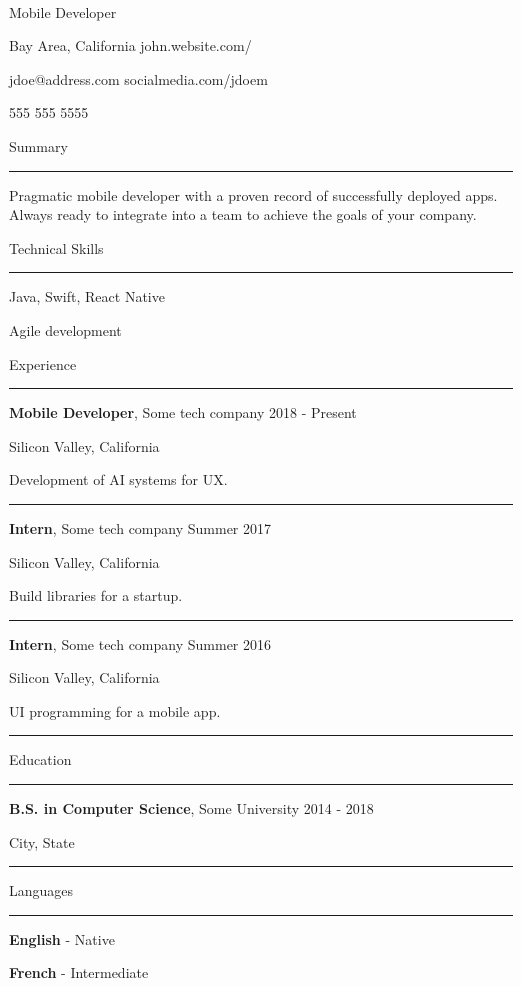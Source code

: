 \documentclass[12pt]{article}
\newcommand{\resumesection}[1]{
    {
        \color{accentcolor}
        \noindent
        \large{#1}
        \vspace{-8pt}

        \noindent
        \rule{\textwidth}{2pt}
    }
}
\newcommand{\info}[2]{
    {
        \color{secondarytext}
        \trivlist\nopagebreak
        \parindent0pt
        \item #1 \hspace{\fill} #2
        \item\relax\obeylines
    }
    \vspace{-5pt}
}
\newcommand{\job}[5]{
    \textbf{#2}, #3 \hspace{\fill} #1

    {\color{secondarytext}#4}

    #5

    \vspace{-5pt}
    {
        \color{secondaccentcolor}
        \rule{0.96\textwidth}{0.5pt}
    }

    \vspace{10pt}
}
\newcommand{\education}[4]{
    \textbf{#2}, #3 \hspace{\fill} #1

    {\color{secondarytext}#4}

    \vspace{-5pt}
    {
        \color{secondaccentcolor}
        \rule{0.96\textwidth}{0.5pt}
    }

    \vspace{10pt}
}
\newcommand{\languageprof}[2]{
    \raisebox{3pt}{$\centerdot$} \textbf{#1} - #2

    \vspace{5pt}
}
\newcommand{\closerlist}[1]{
    \raisebox{3pt}{$\centerdot$} #1

    \vspace{5pt}
}
\begin{document}
\begin{center}
     \\
    \vspace{0.25cm}
    \Large{Mobile Developer}
\end{center}

\info{Bay Area, California}{john.website.com/}
\info{jdoe@address.com}{socialmedia.com/jdoem}
\info{555 555 5555}{}

\vspace{15pt}
\resumesection{Summary}

\hangindent=15pt
Pragmatic mobile developer with a proven record of successfully deployed apps. Always ready to integrate into a team to achieve the goals of your company.

\vspace{15pt}
\resumesection{Technical Skills}

\closerlist{Java, Swift, React Native}
\closerlist{Agile development}

\vspace{10pt}
\resumesection{Experience}

\job{2018 - Present}{Mobile Developer}{Some tech company}{Silicon Valley, California}{\hangindent=15pt Development of AI systems for UX.}

\job{Summer 2017}{Intern}{Some tech company}{Silicon Valley, California}{\hangindent=15pt Build libraries for a startup.}

\job{Summer 2016}{Intern}{Some tech company}{Silicon Valley, California}{\hangindent=15pt UI programming for a mobile app.}

\resumesection{Education}

\education{2014 - 2018}{B.S. in Computer Science}{Some University}{City, State}

\resumesection{Languages}

\languageprof{English}{Native}
\languageprof{French}{Intermediate}
\end{document}
